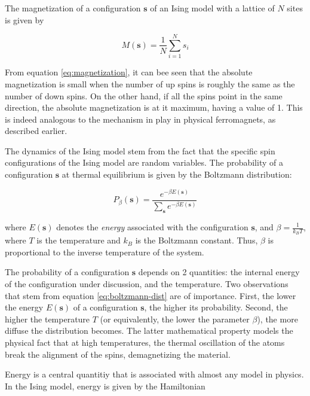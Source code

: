 \documentclass[12pt]{article}
\begin{document}
The magnetization of a configuration $\boldsymbol{s}$ of an Ising model with a lattice of $N$ sites is given by 

\begin{equation}
M(\boldsymbol{s}) = \frac{1}{N} \sum_{i=1}^N s_i
\label{eq:magnetization}
\end{equation}

From equation \ref{eq:magnetization}, it can bee seen that the absolute magnetization is small when the number of up spins is roughly the same as the number of down spins. On the other hand, if all the spins point in the same direction, the absolute magnetization is at it maximum, having a value of 1. This is indeed analogous to the mechanism in play in physical ferromagnets, as described earlier. 

The dynamics of the Ising model stem from the fact that the specific spin configurations of the Ising model are random variables. The probability of a configuration $\boldsymbol{s}$ at thermal equilibrium is given by the Boltzmann distribution: 

\begin{equation}
P_\beta(\boldsymbol{s}) = \frac{e^{-\beta E(\boldsymbol{s})}}{\sum_{\boldsymbol{s}} e^{-\beta E(\boldsymbol{s})}}
\label{eq:boltzmann-dist}
\end{equation}

where $E(\boldsymbol{s})$ denotes the \textit{energy} associated with the configuration $\boldsymbol{s}$, and $\beta = \frac{1}{k_B T}$, where $T$ is the temperature and $k_B$ is the Boltzmann constant. Thus, $\beta$ is proportional to the inverse temperature of the system.  

The probability of a configuration $\boldsymbol{s}$ depends on 2 quantities: the internal energy of the configuration under discussion, and the temperature. Two observations that stem from equation \ref{eq:boltzmann-dist} are of importance. First, the lower the energy $E(\boldsymbol{s})$ of a configuration $\boldsymbol{s}$, the higher its probability. Second, the higher the temperature $T$ (or equivalently, the lower the parameter $\beta$), the more diffuse the distribution becomes. The latter mathematical property models the physical fact that at high temperatures, the thermal oscillation of the atoms break the alignment of the spins, demagnetizing the material. 

Energy is a central quantitiy that is associated with almost any model in physics. In the Ising model, energy is given by the Hamiltonian
\end{document}
